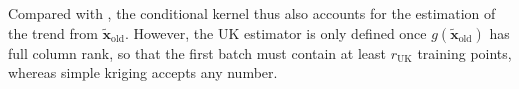 Compared with , the conditional kernel thus also accounts for the estimation of the trend from $\tilde{\mathbf{x}}_{\mathrm{old}}$. However, the UK estimator is only defined once $g(\tilde{\mathbf{x}}_{\mathrm{old}})$ has full column rank, so that the first batch must contain at least $r_{\mathrm{UK}}$ training points, whereas simple kriging accepts any number.

